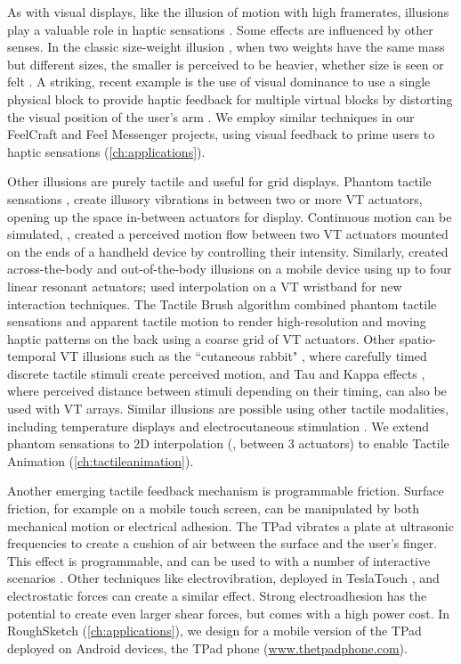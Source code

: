 As with visual displays, like the illusion of motion with high framerates, illusions play a valuable role in haptic sensations \cite{Hayward2016}.
Some effects are influenced by other senses.
In the classic size-weight illusion \cite{charpentier1891analyse}, when two weights have the same mass but different sizes, the smaller is perceived to be heavier, whether size is seen or felt \cite{Hayward2016}.
A striking, recent example is the use of visual dominance to use a single physical block to provide haptic feedback for multiple virtual blocks by distorting the visual position of the user's arm \cite{Azmandian2016}.
We employ similar techniques in our FeelCraft and Feel Messenger projects, using visual feedback to prime users to haptic sensations (\autoref{ch:applications}).

Other illusions are purely tactile and useful for grid displays.
Phantom tactile sensations \cite{Alles1970}, create illusory vibrations in between two or more VT actuators, opening up the space in-between actuators for display.
Continuous motion can be simulated, \eg, \citet{Seo2010} created a perceived motion flow between two VT actuators mounted on the ends of a handheld device by controlling their intensity.
Similarly, \citet{Lee2012a} created across-the-body and out-of-the-body illusions on a mobile device using up to four %
linear resonant actuators; \citet{Gupta2016} used interpolation on a VT wristband for new interaction techniques.
The Tactile Brush algorithm \cite{Israr2011a} combined phantom tactile sensations and apparent tactile motion to render high-resolution and moving haptic patterns on the back using a coarse grid of VT actuators. 
Other spatio-temporal VT illusions such as the ``cutaneous rabbit"  \cite{Tan2009}, where carefully timed discrete tactile stimuli create perceived motion, and Tau and Kappa effects \cite{Hayward2008,Hayward2016}, where perceived distance between stimuli depending on their timing, can also be used with VT arrays.
Similar illusions are possible using other tactile modalities, including temperature displays \cite{Singhal2016} and electrocutaneous stimulation \cite{Tanie1980}.
We extend phantom sensations to 2D interpolation (\eg, between 3 actuators) to enable Tactile Animation (\autoref{ch:tactileanimation}).

Another emerging tactile feedback mechanism is programmable friction.
Surface friction, for example on a mobile touch screen, can be manipulated by both mechanical motion or electrical adhesion.
The TPad \cite{Winfield2007a} vibrates a plate at ultrasonic frequencies to create a cushion of air between the surface and the user's finger.
This effect is programmable, and can be used to with a number of interactive scenarios \cite{Levesque2011}.
Other techniques like electrovibration, deployed in TeslaTouch \cite{Bau2010}, and electrostatic forces \cite{Meyer2013} can create a similar effect.
Strong electroadhesion \cite{Shultz2015} has the potential to create even larger shear forces, but comes with a high power cost.
In RoughSketch (\autoref{ch:applications}), we design for a mobile version of the TPad deployed on Android devices, the TPad phone (\url{www.thetpadphone.com}).

